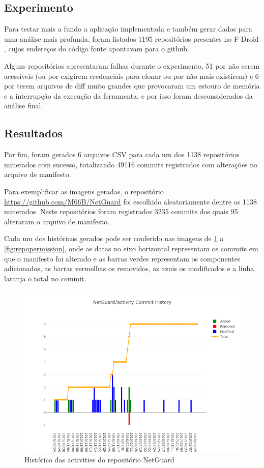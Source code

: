 \documentclass[a4paper,12pt]{article}
\begin{document}
\subsection{Experimento}%
\label{sec:experimentos}

Para testar mais a fundo a aplicação implementada e também gerar dados para uma análise  mais profunda, foram listados 1195 repositórios presentes no F-Droid \cite{fdroid}, cujos endereços do código fonte apontavam para o github.

Alguns repositórios apresentaram falhas durante o experimento, 51 por não serem acessíveis (ou por exigirem credenciais para clonar ou por não mais existirem) e 6 por terem arquivos de diff muito grandes que provocaram um estouro de memória e a interrupção da execução da ferramenta, e por isso foram desconsiderados da análise final. 


\subsection{Resultados}%
\label{sec:resultados}
Por fim, foram gerados 6 arquivos CSV para cada um dos 1138 repositórios minerados com sucesso, totalizando 49116 commits registrados com alterações no arquivo de manifesto.

Para exemplificar as imagens geradas, o repositório {\fontsize{10pt}{12pt}\url{https://github.com/M66B/NetGuard}} foi escolhido aleatoriamente dentre os 1138 minerados. Neste repositórios foram registrados 3235 commits dos quais 95 alteraram o arquivo de manifesto.

Cada um dos históricos gerados pode ser conferido nas imagens de \ref{fig:repoactivity} a \ref{fig:repopermission}, onde as datas no eixo horizontal representam os commits em que o manifesto foi alterado e  as barras verdes representam os componentes adicionados, as barras vermelhas os removidos, as azuis os modificados e a linha laranja o total no commit. 

\begin{figure}[H]
\centering
\includegraphics[width=\linewidth,height=0.5\linewidth]{imgs/NetGuard_activity_history.png}
\caption{Histórico das activities do repositório NetGuard}
\label{fig:repoactivity}
\end{figure}
\end{document}
